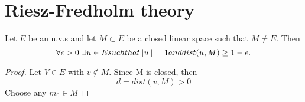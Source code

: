 \documentclass[a4paper]{book}
\begin{document}
\section{Riesz-Fredholm theory}
    \begin{lemma}
        Let $E$ be an n.v.s and let $M \subset E$ be a closed linear space such that $M \not = E$. Then 
                    \[ \forall \epsilon > 0 \ \exists u \in E such that \| {u} \| _{}=1 and dist(u,M) \ge 1 - \epsilon. \]
        \begin{proof} 
        Let $V \in E$ with $v \notin M$. Since M is closed, then 
                    \[ d=dist(v,M)>0 \]
        Choose any $ m _ 0  \in  M$ 
        \end{proof}
    \end{lemma}
    
\end{document}
